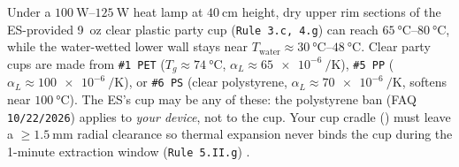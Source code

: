 \begin{devicebox}
Under a $\SIrange{100}{125}{\watt}$ heat lamp at $\SI{40}{\centi\meter}$ height, dry upper rim sections of the ES-provided 9~oz clear plastic party cup (\texttt{Rule 3.c, 4.g}) can reach $\SIrange{65}{80}{\celsius}$, while the water-wetted lower wall stays near $T_{\mathrm{water}} \approx \SIrange{30}{48}{\celsius}$. Clear party cups are made from \texttt{\#1 PET} ($T_g \approx \SI{74}{\celsius}$, $\alpha_L \approx \SI{65e-6}{\per\kelvin}$), \texttt{\#5 PP} ($\alpha_L \approx \SI{100e-6}{\per\kelvin}$), or \texttt{\#6 PS} (clear polystyrene, $\alpha_L \approx \SI{70e-6}{\per\kelvin}$, softens near $\SI{100}{\celsius}$). The ES's cup may be any of these: the polystyrene ban (FAQ \texttt{10/22/2026}) applies to \emph{your device}, not to the cup. Your cup cradle () must leave a $\ge\SI{1.5}{\milli\meter}$ radial clearance so thermal expansion never binds the cup during the 1-minute extraction window (\texttt{Rule 5.II.g}) .
\end{devicebox}

